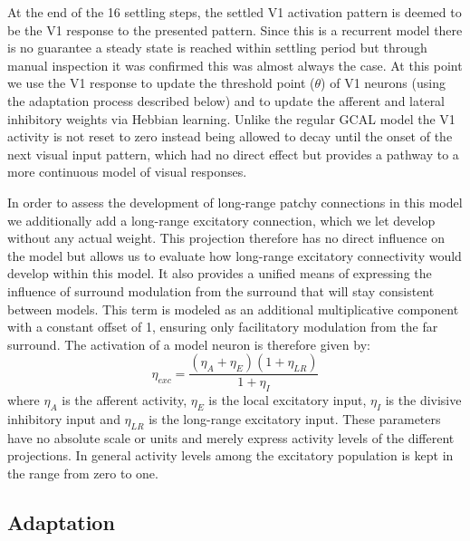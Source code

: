 At the end of the 16 settling steps, the settled V1 activation pattern
is deemed to be the V1 response to the presented pattern. Since this
is a recurrent model there is no guarantee a steady state is reached
within settling period but through manual inspection it was confirmed
this was almost always the case. At this point we use the V1 response
to update the threshold point ($\theta$) of V1 neurons (using the
adaptation process described below) and to update the afferent and
lateral inhibitory weights via Hebbian learning. Unlike the regular
GCAL model the V1 activity is not reset to zero instead being allowed
to decay until the onset of the next visual input pattern, which had
no direct effect but provides a pathway to a more continuous model of
visual responses.

In order to assess the development of long-range patchy connections in
this model we additionally add a long-range excitatory connection,
which we let develop without any actual weight. This projection
therefore has no direct influence on the model but allows us to
evaluate how long-range excitatory connectivity would develop within
this model. It also provides a unified means of expressing the
influence of surround modulation from the surround that will stay
consistent between models. This term is modeled as an additional
multiplicative component with a constant offset of 1, ensuring only
facilitatory modulation from the far surround. The activation of a
model neuron is therefore given by:
\begin{equation}
  \eta_{exc} = \frac{(\eta_{A} + \eta_{E})(1+\eta_{LR})}{1 + \eta_{I}}
\end{equation}
where $\eta_A$ is the afferent activity, $\eta_E$ is the local
excitatory input, $\eta_I$ is the divisive inhibitory input and
$\eta_{LR}$ is the long-range excitatory input. These parameters have
no absolute scale or units and merely express activity levels of the
different projections. In general activity levels among the excitatory
population is kept in the range from zero to one.

\subsection*{Adaptation}

